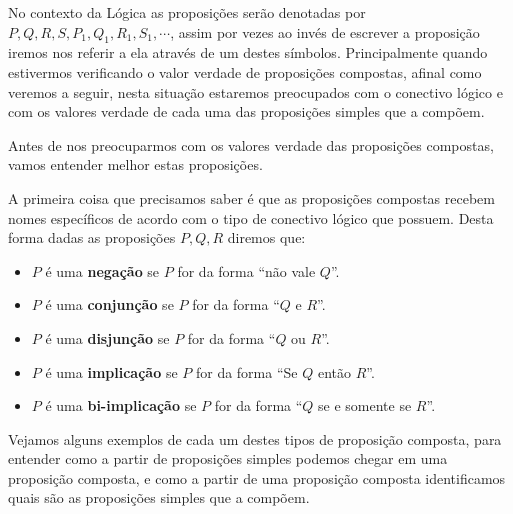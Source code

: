  No contexto da Lógica as proposições serão denotadas por $P, Q, R, S, P_1, Q_1, R_1, S_1, \cdots$, assim por vezes ao invés de escrever a proposição iremos nos referir a ela através de um destes símbolos. Principalmente quando estivermos verificando o valor verdade de proposições compostas, afinal como veremos a seguir, nesta situação estaremos preocupados com o conectivo lógico e com os valores verdade de cada uma das proposições simples que a compõem.
 
 Antes de nos preocuparmos com os valores verdade das proposições compostas, vamos entender melhor estas proposições.
 
 A primeira coisa que precisamos saber é que as proposições compostas recebem nomes específicos de acordo com o tipo de conectivo lógico que possuem. Desta forma dadas as proposições $P, Q, R$ diremos que:
 
 \begin{itemize}
  \item $P$ é uma \textbf{negação} se $P$ for da forma ``não vale $Q$''.
  \item $P$ é uma \textbf{conjunção} se $P$ for da forma ``$Q$ e $R$''.
  \item $P$ é uma \textbf{disjunção} se $P$ for da forma ``$Q$ ou $R$''.
  \item $P$ é uma \textbf{implicação} se $P$ for da forma ``Se $Q$ então $R$''.
  \item $P$ é uma \textbf{bi-implicação} se $P$ for da forma ``$Q$ se e somente se $R$''.
 \end{itemize}

 Vejamos alguns exemplos de cada um destes tipos de proposição composta, para entender como a partir de proposições simples podemos chegar em uma proposição composta, e como a partir de uma proposição composta identificamos quais são as proposições simples que a compõem.
 
